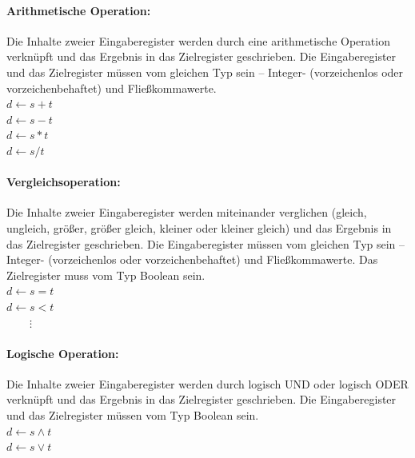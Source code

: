\documentclass[twoside,a4paper,fleqn,12pt]{article}
\begin{document}
\paragraph{Arithmetische Operation:} Die Inhalte zweier Eingaberegister 
werden durch eine arithmetische Operation verknüpft und das Ergebnis in das Zielregister geschrieben.
Die Eingaberegister und das Zielregister müssen vom gleichen Typ sein -- Integer- (vorzeichenlos oder vorzeichenbehaftet) und Fließkommawerte.
\\\hspace*{1cm}$d \gets s + t$
\\\hspace*{1cm}$d \gets s - t$
\\\hspace*{1cm}$d \gets s * t$
\\\hspace*{1cm}$d \gets s / t$

\paragraph{Vergleichsoperation:} Die Inhalte zweier Eingaberegister 
werden miteinander verglichen (gleich, ungleich, größer, größer gleich, kleiner oder kleiner gleich) und das Ergebnis in das Zielregister geschrieben.
Die Eingaberegister müssen vom gleichen Typ sein -- Integer- (vorzeichenlos oder vorzeichenbehaftet) und Fließkommawerte.
Das Zielregister muss vom Typ Boolean sein.
\\\hspace*{1cm}$d \gets s = t$
\\\hspace*{1cm}$d \gets s < t$
\\\hspace*{1cm}$\phantom{d \gets}\vdots$

\paragraph{Logische Operation:} Die Inhalte zweier Eingaberegister werden durch logisch UND oder logisch ODER verknüpft und das Ergebnis in das Zielregister geschrieben.
Die Eingaberegister und das Zielregister müssen vom Typ Boolean sein.
\\\hspace*{1cm}$d \gets s \land t$
\\\hspace*{1cm}$d \gets s \lor t$
\end{document}

